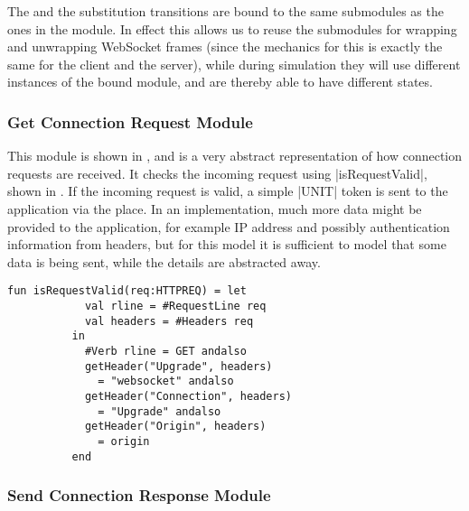 	The  and the
	 substitution transitions are bound to the
	same submodules as the ones in the  module. In
	effect this allows us to reuse the submodules for wrapping and unwrapping
	WebSocket frames (since the mechanics for this is exactly the same for the
	client and the server), while during simulation they will use different
	instances of the bound module, and are thereby able to have different states.
	
	\subsubsection{Get Connection Request Module}
		
		
		This module is shown in , and is a very abstract
		representation of how connection requests are received. It checks the incoming request using
		|isRequestValid|, shown in . If the incoming request
		is valid, a simple |UNIT| token is sent to the application via the
		 place. In an implementation, much more data might
		be provided to the application, for example IP address and possibly
		authentication information from headers, but for this model it is sufficient
		to model that some data is being sent, while the details are abstracted away.

		\begin{lstlisting}[label=lst:isRequestValid,caption=isRequestValid,gobble=2,float]
		fun isRequestValid(req:HTTPREQ) = let
            val rline = #RequestLine req
            val headers = #Headers req
          in
            #Verb rline = GET andalso
            getHeader("Upgrade", headers) 
              = "websocket" andalso
            getHeader("Connection", headers) 
              = "Upgrade" andalso
            getHeader("Origin", headers) 
              = origin 
          end
		\end{lstlisting}
		
	\subsubsection{Send Connection Response Module}
		
		
